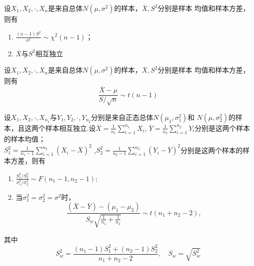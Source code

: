 \begin{theorem}
    设$X_1,X_2,\cdot,X_n$是来自总体$N(\mu,\sigma^2)$的样本，$\overline{X},S^2$分别是样本
    均值和样本方差，则有
    \begin{enumerate}[1°]
        \item $\displaystyle{\frac{(n-1)S^2}{\sigma^2}\sim \chi^2(n-1)}$；
        \item $\overline{X}$与$S^2$相互独立
    \end{enumerate} 
\end{theorem}

\begin{theorem}
    设$X_1,X_2,\cdot,X_n$是来自总体$N(\mu,\sigma^2)$的样本，$\overline{X},S^2$分别是样本
    均值和样本方差，则有
    $$\frac{\overline{X}-\mu}{S/\sqrt{n}}\sim t(n-1)$$
\end{theorem}

\begin{theorem}
    设$X_1,X_2,\cdot,X_{n_1}$与$Y_1,Y_2,\cdot,Y_{n_2}$分别是来自正态总体$N(\mu_1,\sigma_1^2)$和
    $N(\mu,\sigma_2^2)$的样本，且这两个样本相互独立.设$\displaystyle{\overline{X}=\frac{1}{n_1}\sum_{i=1}^{n_1}X_i}$,
    $\displaystyle{\overline{Y}=\frac{1}{n_2}\sum_{i=1}^{n_2}Y_i}$分别是这两个样本的样本均值；\\
    $\displaystyle{S_1^2=\frac{1}{n_1-1}\sum_{i=1}^{n_1}{(X_i-\overline{X})}^2}$
    ,$\displaystyle{S^2_2=\frac{1}{n_2-1}\sum_{i=1}^{n_2}{(Y_i-\overline{Y})}^2}$分别是这两个样本的样本方差，则有
    \begin{enumerate}[1°]
        \item $\displaystyle{\frac{S_1^2/S_2^2}{\sigma_1^2/\sigma_2^2}\sim F(n_1-1,n_2-1)}$;
        \item 当$\sigma_1^2=\sigma_2^2=\sigma^2$时，
        $$\frac{(\overline{X}-\overline{Y})-(\mu_1-\mu_2)}{S_w\sqrt{\frac{1}{n_1}+\frac{1}{n_2}}}\sim t(n_1+n_2-2),$$
    \end{enumerate}
    其中
    $$S_w^2=\frac{(n_1-1)S_1^2+(n_2-1)S_2^2}{n_1+n_2-2},\quad S_w=\sqrt{S_w^2}$$
\end{theorem}